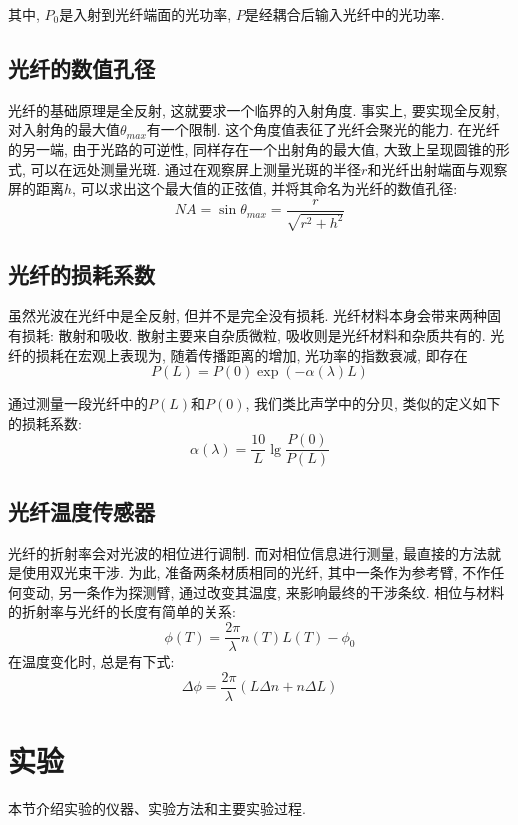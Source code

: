 \documentclass[12pt,a4paper]{article}
\begin{document}
其中, $P_0$是入射到光纤端面的光功率, $P$是经耦合后输入光纤中的光功率. 
\subsection{光纤的数值孔径}
光纤的基础原理是全反射, 这就要求一个临界的入射角度. 事实上, 要实现全反射, 对入射角的最大值$\theta_{max}$有一个限制. 
这个角度值表征了光纤会聚光的能力. 在光纤的另一端, 由于光路的可逆性, 同样存在一个出射角的最大值, 大致上呈现圆锥的形式, 可以在远处测量光斑. 
通过在观察屏上测量光斑的半径$r$和光纤出射端面与观察屏的距离$h$, 可以求出这个最大值的正弦值, 并将其命名为光纤的数值孔径:
\begin{equation}
    NA=\sin{\theta_{max}}=\frac{r}{\sqrt{r^2+h^2}}
\end{equation}

\subsection{光纤的损耗系数}
虽然光波在光纤中是全反射, 但并不是完全没有损耗. 光纤材料本身会带来两种固有损耗: 散射和吸收. 散射主要来自杂质微粒, 吸收则是光纤材料和杂质共有的. 
光纤的损耗在宏观上表现为, 随着传播距离的增加, 光功率的指数衰减, 即存在
\begin{equation}
    P(L)=P(0)\exp{(-\alpha(\lambda)L)}
\end{equation}

通过测量一段光纤中的$P(L)$和$P(0)$, 我们类比声学中的分贝, 类似的定义如下的损耗系数: 
\begin{equation}
    \alpha(\lambda)=\frac{10}{L}\lg{\frac{P(0)}{P(L)}}
\end{equation}

\subsection{光纤温度传感器}
光纤的折射率会对光波的相位进行调制. 而对相位信息进行测量, 最直接的方法就是使用双光束干涉. 为此, 准备两条材质相同的光纤, 其中一条作为参考臂, 不作任何变动, 
另一条作为探测臂, 通过改变其温度, 来影响最终的干涉条纹. 相位与材料的折射率与光纤的长度有简单的关系: 
\begin{equation}
    \phi(T)=\frac{2\pi}{\lambda}n(T)L(T)-\phi_0
\end{equation}
在温度变化时, 总是有下式:
\begin{equation}
\Delta \phi=\frac{2\pi}{\lambda}(L\Delta n + n \Delta L)
\end{equation}

\section{实验}
本节介绍实验的仪器、实验方法和主要实验过程.
\end{document}
